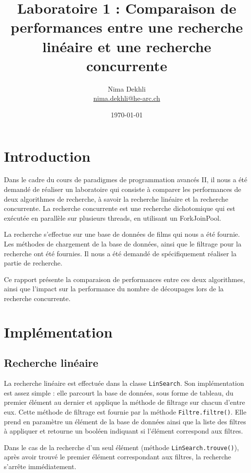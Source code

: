 \documentclass[
  french,
  a4paper,
]{scrartcl}
\title{Laboratoire 1 : Comparaison de performances entre une recherche linéaire et une recherche concurrente}
\author{Nima Dekhli\\
    \small \href{mailto:nima.dekhli@he-arc.ch}{nima.dekhli@he-arc.ch}}
\date{\today}
\begin{document}
\maketitle
\tableofcontents

\section{Introduction}

Dans le cadre du cours de paradigmes de programmation avancés II, il nous 
a été demandé de réaliser un laboratoire qui consiste à comparer les performances
de deux algorithmes de recherche, à savoir la recherche linéaire et la recherche
concurrente. La recherche concurrente est une recherche dichotomique qui est
exécutée en parallèle sur plusieurs threads, en utilisant un ForkJoinPool.

La recherche s'effectue sur une base de données de films qui nous a été fournie. 
Les méthodes de chargement de la base de données, ainsi que le filtrage 
pour la recherche ont été fournies. Il nous a été demandé de spécifiquement réaliser
la partie de recherche. 

Ce rapport présente la comparaison de performances entre ces deux algorithmes, 
ainsi que l'impact sur la performance du nombre de découpages 
lors de la recherche concurrente.

\section{Implémentation}

\subsection{Recherche linéaire}

La recherche linéaire est effectuée dans la classe 
\lstinline|LinSearch|. Son implémentation est assez simple : 
elle parcourt la base de données, sous forme de tableau, du premier élément 
au dernier et applique la méthode de filtrage sur chacun d'entre eux. 
Cette méthode de filtrage est fournie par la méthode \lstinline|Filtre.filtre()|.
Elle prend en paramètre un élément de la base de données ainsi que la liste des filtres
à appliquer et retourne un booléen indiquant si l'élément correspond aux filtres. 

Dans le cas de la recherche d'un seul élément (méthode \lstinline|LinSearch.trouve()|), après 
avoir trouvé le premier élément correspondant aux filtres, la recherche s'arrête 
immédiatement. 
\end{document}
